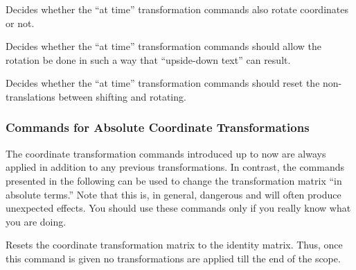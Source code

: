 {
  \let\ifpgfslopedattime=\relax
  \begin{textoken}{\ifpgfslopedattime}
    Decides whether the ``at time'' transformation commands also
    rotate coordinates or not.
  \end{textoken}
}
{
  \let\ifpgfallowupsidedowattime=\relax
  \begin{textoken}{\ifpgfallowupsidedowattime}
    Decides whether the ``at time'' transformation commands should
    allow the rotation be done in such a way that ``upside-down text''
    can result.
  \end{textoken}
}
{
  \let\ifpgfresetnontranslationsattime=\relax
  \begin{textoken}{\ifpgfresetnontranslationsattime}
    Decides whether the ``at time'' transformation commands should
    reset the non-translations between shifting and rotating.
  \end{textoken}
}


\subsubsection{Commands for Absolute Coordinate Transformations}

The coordinate transformation commands introduced up to now are always
applied in addition to any previous transformations. In contrast, the
commands presented in the following can be used to change the
transformation matrix ``in absolute terms.'' Note that this is, in general,
dangerous and will often produce unexpected effects. You should use
these commands only if you really know what you are doing.

\begin{command}{\pgftransformreset}
  Resets the coordinate transformation matrix to the identity
  matrix. Thus, once this command is given no transformations are
  applied till the end of the scope.
\begin{codeexample}[]
\end{codeexample}
\end{command}


